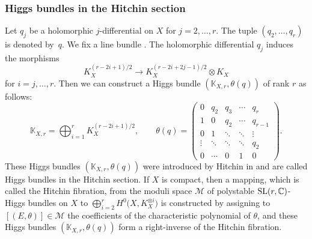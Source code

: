 \documentclass[pdftex]{sigma}
\numberwithin{equation}{section}
\begin{document}
\subsubsection{Higgs bundles in the Hitchin section}
Let $q_j$ be a holomorphic $j$-differential on $X$ for $j=2,\ldots,r$. The tuple $(q_2,\dots,q_r)$ is denoted by~$q$. We fix a line bundle . The holomorphic differential $q_j$ induces the morphisms
\begin{equation*}
 K_X ^{(r-2i+1)/2} \longrightarrow K_X ^{(r-2i+2j-1)/2}\otimes K_X
\end{equation*}
for $i=j,\ldots,r$. Then we can construct a Higgs bundle $(\mathbb{K}_{X,r},\theta(q))$ of rank $r$ as follows:
\begin{equation*}
 \mathbb{K}_{X,r} = \bigoplus_{i=1}^r K_X^{(r-2i+1)/2},\qquad
 \theta(q) =
 \begin{pmatrix}
 0 & q_2 & q_3 &\cdots & q_r \\
 1 & 0 & q_2 & \cdots & q_{r-1} \\
 0 & 1 & \ddots & \ddots & \vdots \\
 \vdots & \ddots & \ddots & \ddots & q_2 \\
 0 & \cdots & 0 & 1 & 0
\end{pmatrix}.
\end{equation*}
These Higgs bundles $(\mathbb{K}_{X,r},\theta(q))$ were introduced by Hitchin in \cite{Hi2} and are called Higgs bundles in the Hitchin section. If $X$ is compact, then a mapping, which is called the Hitchin fibration, from the moduli space $\mathcal{M}$ of polystable ${\rm SL}(r,\mathbb{C})$-Higgs bundles on $X$ to $\bigoplus_{i=2}^r H^0\bigl(X,K_X^{\otimes i}\bigr)$ is constructed by assigning to $[(E,\theta)] \in \mathcal{M}$ the coefficients of the characteristic polynomial of $\theta$, and these Higgs bundles $(\mathbb{K}_{X,r},\theta(q))$ form a right-inverse of the Hitchin fibration.
\end{document}

